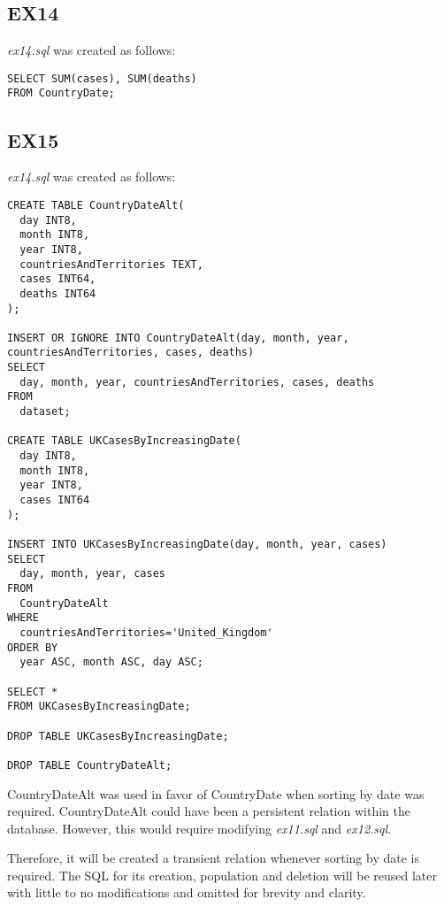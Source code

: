\documentclass{article}
\begin{document}
\subsection{EX14}
\textit{ex14.sql} was created as follows: 
\begin{verbatim}
SELECT SUM(cases), SUM(deaths)
FROM CountryDate;
\end{verbatim}

\subsection{EX15}
\textit{ex14.sql} was created as follows: 
\begin{verbatim}
CREATE TABLE CountryDateAlt(
  day INT8,
  month INT8,
  year INT8,
  countriesAndTerritories TEXT,
  cases INT64,
  deaths INT64
);

INSERT OR IGNORE INTO CountryDateAlt(day, month, year, countriesAndTerritories, cases, deaths)
SELECT
  day, month, year, countriesAndTerritories, cases, deaths
FROM
  dataset;

CREATE TABLE UKCasesByIncreasingDate(
  day INT8,
  month INT8,
  year INT8,
  cases INT64
);

INSERT INTO UKCasesByIncreasingDate(day, month, year, cases)
SELECT
  day, month, year, cases
FROM
  CountryDateAlt
WHERE
  countriesAndTerritories='United_Kingdom'
ORDER BY
  year ASC, month ASC, day ASC;

SELECT *
FROM UKCasesByIncreasingDate;

DROP TABLE UKCasesByIncreasingDate;

DROP TABLE CountryDateAlt;
\end{verbatim}
CountryDateAlt was used in favor of CountryDate when sorting by date was required. CountryDateAlt could have been a persistent relation within the database. However, this would require modifying \textit{ex11.sql} and \textit{ex12.sql}. 

Therefore, it will be created a transient relation whenever sorting by date is required. The SQL for its creation, population and deletion will be reused later with little to no modifications and omitted for brevity and clarity.
\end{document}
